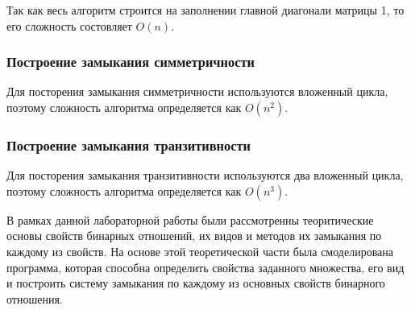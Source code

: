 \documentclass[spec, och, labwork]{shiza}
\begin{document}
            Так как весь алгоритм строится на заполнении главной диагонали матрицы 1, то его сложность состовляет $O(n)$.

        \subsubsection{Построение замыкания симметричности}

            Для посторения замыкания симметричности используются вложенный цикла, поэтому сложность алгоритма
            определяется как $O(n^2)$.

        \subsubsection{Построение замыкания транзитивности}

            Для посторения замыкания транзитивности используются два вложенный цикла, поэтому сложность алгоритма
            определяется как $O(n^3)$.
    
\conclusion

В рамках данной лабораторной работы были рассмотренны теоритические основы свойств бинарных отношений, их видов и методов
их замыкания по каждому из свойств. На основе этой теоретической части была смоделирована программа, которая способна
определить свойства заданного множества, его вид и построить систему замыкания по каждому из основных свойств бинарного
отношения.
\end{document}
